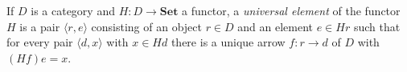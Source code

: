 If $D$ is a category and $H: D \to \mathbf{Set}$ a functor, a \emph{universal element} of the functor $H$ is a pair $\langle r, e \rangle$ consisting of an object $r \in D$ and an element $e \in Hr$ such that for every pair $\langle d, x \rangle$ with $x \in Hd$ there is a unique arrow $f: r \to d$ of $D$ with $(Hf)e = x$.
